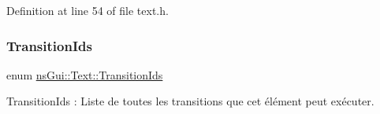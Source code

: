 Definition at line 54 of file text.\+h.

\mbox{\label{classns_gui_1_1_text_a5fa355035f5afc9c896fa8138c29ea09}} 
\subsubsection{\texorpdfstring{Transition\+Ids}{TransitionIds}}
{\footnotesize\ttfamily enum \hyperlink{classns_gui_1_1_text_a5fa355035f5afc9c896fa8138c29ea09}{ns\+Gui\+::\+Text\+::\+Transition\+Ids}}



Transition\+Ids \+: Liste de toutes les transitions que cet élément peut exécuter. 

